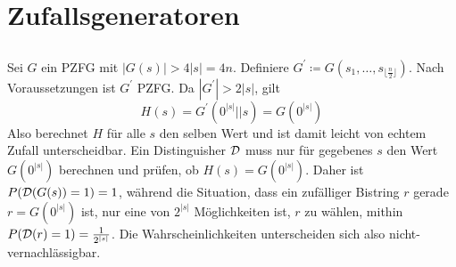 \documentclass{../crypto}
\date{27. November 2015}
\begin{document}
\maketitle

\section{Zufallsgeneratoren}

\subsection{}

Sei $G$ ein PZFG mit $|G(s)| > 4|s| = 4n$. Definiere $G^\prime \coloneqq
G(s_1,\ldots,s_{\lfloor \frac{n}{2} \rfloor})$. Nach Voraussetzungen ist
$G^\prime$ PZFG. Da $|G^\prime| > 2|s|$, gilt 
\begin{equation*}
   H(s) = G^\prime(0^{|s|} || s) = G(0^{|s|})
\end{equation*}
Also berechnet $H$ für alle $s$ den selben Wert und ist damit leicht von echtem
Zufall unterscheidbar. Ein Distinguisher $\mathcal{D}$ muss nur für gegebenes $s$
den Wert $G(0^{|s|})$ berechnen und prüfen, ob $H(s) = G(0^{|s|})$. Daher ist
$P(\mathcal{D}(G(s)) = 1) = 1$, während die Situation, dass ein zufälliger
Bistring $r$ gerade $r=G(0^{|s|})$ ist, nur eine von $2^{|s|}$ Möglichkeiten
ist, $r$ zu wählen, mithin $P(\mathcal{D}(r) = 1) = \frac{1}{2^{|s|}}$. Die
Wahrscheinlichkeiten unterscheiden sich also nicht-vernachlässigbar.
\end{document}
